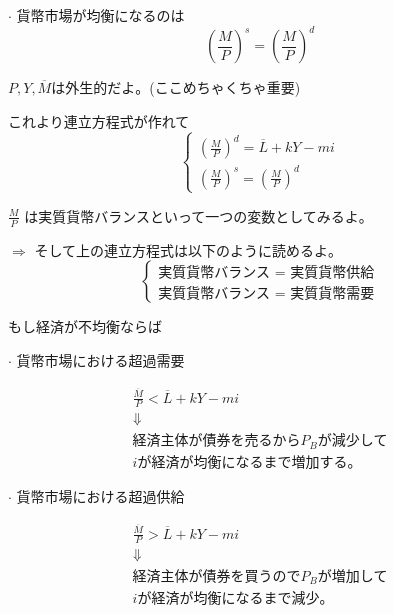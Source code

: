 \documentclass[a4paper, 12pt]{article}
\begin{document}
\qquad $\cdot$ 貨幣市場が均衡になるのは
\begin{equation*}
\left(\frac{M}{P}\right)^s=\left(\frac{M}{P}\right)^d
\end{equation*}

\qquad $P,Y, \overline{M}$は外生的だよ。(ここめちゃくちゃ重要)

これより連立方程式が作れて
\begin{displaymath}
\left\{
\begin{array}{c}
\left(\frac{M}{P}\right)^d=\overline{L}+kY-mi \\
\left(\frac{M}{P}\right)^s=\left(\frac{M}{P}\right)^d
\end{array}
\right.
\end{displaymath}

$\displaystyle \frac{M}{P}$ は実質貨幣バランスといって一つの変数としてみるよ。

\quad $\Rightarrow$ そして上の連立方程式は以下のように読めるよ。
\begin{displaymath}
\left\{
\begin{array}{c}
\text{実質貨幣バランス = 実質貨幣供給} \\
\text{実質貨幣バランス = 実質貨幣需要}
\end{array}
\right.
\end{displaymath}

もし経済が不均衡ならば

\noindent
$\cdot$ 貨幣市場における超過需要

\begin{displaymath}
\begin{array}{c}
\frac{\overline{M}}{P}<\overline{L}+kY-mi \\
\Downarrow \\
\text{経済主体が債券を売るから}P_B \text{が減少して} \\
i \text{が経済が均衡になるまで増加する。}
\end{array}
\end{displaymath}

\noindent
$\cdot$ 貨幣市場における超過供給

\begin{displaymath}
\begin{array}{c}
\frac{\overline{M}}{P}>\overline{L}+kY-mi \\
\Downarrow \\
\text{経済主体が債券を買うので}P_B \text{が増加して} \\
i \text{が経済が均衡になるまで減少。}
\end{array}
\end{displaymath}
\end{document}

